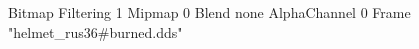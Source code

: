 {Bitmap
	{Filtering 1}
	{Mipmap 0}
	{Blend none}
	{AlphaChannel 0}
	{Frame "helmet_rus36#burned.dds"}
}

